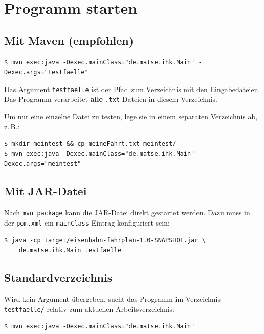 \documentclass[12pt,a4paper]{article}
\begin{document}
\section{Programm starten}

\subsection{Mit Maven (empfohlen)}

\begin{lstlisting}[style=terminal]
$ mvn exec:java -Dexec.mainClass="de.matse.ihk.Main" -Dexec.args="testfaelle"
\end{lstlisting}

Das Argument \texttt{testfaelle} ist der Pfad zum Verzeichnis mit den Eingabedateien. Das Programm verarbeitet \textbf{alle} \texttt{.txt}-Dateien in diesem Verzeichnis.

\begin{tipp}
Um nur eine einzelne Datei zu testen, lege sie in einem separaten Verzeichnis ab, z.\,B.:
\begin{lstlisting}[style=terminal]
$ mkdir meintest && cp meineFahrt.txt meintest/
$ mvn exec:java -Dexec.mainClass="de.matse.ihk.Main" -Dexec.args="meintest"
\end{lstlisting}
\end{tipp}

\subsection{Mit JAR-Datei}

Nach \texttt{mvn package} kann die JAR-Datei direkt gestartet werden. Dazu muss in der \texttt{pom.xml} ein \texttt{mainClass}-Eintrag konfiguriert sein:

\begin{lstlisting}[style=terminal]
$ java -cp target/eisenbahn-fahrplan-1.0-SNAPSHOT.jar \
    de.matse.ihk.Main testfaelle
\end{lstlisting}

\subsection{Standardverzeichnis}

Wird kein Argument übergeben, sucht das Programm im Verzeichnis \texttt{testfaelle/} relativ zum aktuellen Arbeitsverzeichnis:

\begin{lstlisting}[style=terminal]
$ mvn exec:java -Dexec.mainClass="de.matse.ihk.Main"
\end{lstlisting}
\end{document}
